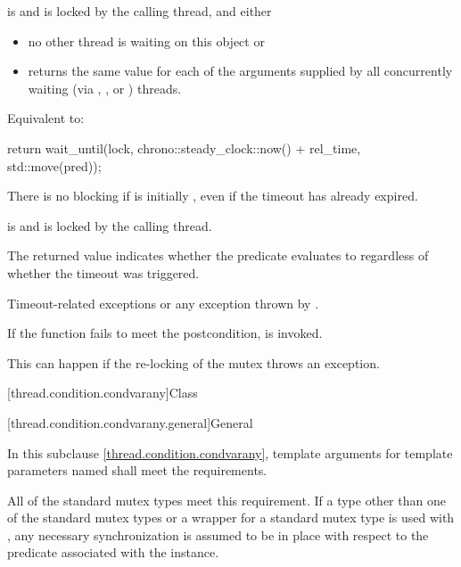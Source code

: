 \begin{itemdescr}
\pnum
\expects
{} is  and 
is locked by the calling thread, and either
\begin{itemize}
\item
no other thread is waiting on this  object or

\item
{} returns the same value for each of the  arguments
supplied by all concurrently waiting (via , , or
) threads.
\end{itemize}

\pnum
\effects
Equivalent to:
\begin{codeblock}
return wait_until(lock, chrono::steady_clock::now() + rel_time, std::move(pred));
\end{codeblock}

\pnum
\begin{note}
There is no blocking if  is initially , even if the
timeout has already expired.
\end{note}

\pnum
\ensures
{} is  and 
is locked by the calling thread.

\pnum
\begin{note}
The returned value indicates whether the predicate evaluates to 
regardless of whether the timeout was triggered.
\end{note}

\pnum
\throws
Timeout-related
exceptions or any exception thrown by .

\pnum
\remarks
If the function fails to meet the postcondition, 
is invoked.
\begin{note}
This can happen if the re-locking of the mutex throws an exception.
\end{note}
\end{itemdescr}

[thread.condition.condvarany]{Class }

[thread.condition.condvarany.general]{General}

\pnum
In this subclause \ref{thread.condition.condvarany},
template arguments for template parameters named 
shall meet the 
requirements.
\begin{note}
All of the standard
mutex types meet this requirement. If a type other than one of the
standard mutex types or a  wrapper for a standard mutex type
is used with , any
necessary synchronization is assumed to be in place with respect to the predicate associated
with the  instance.
\end{note}

